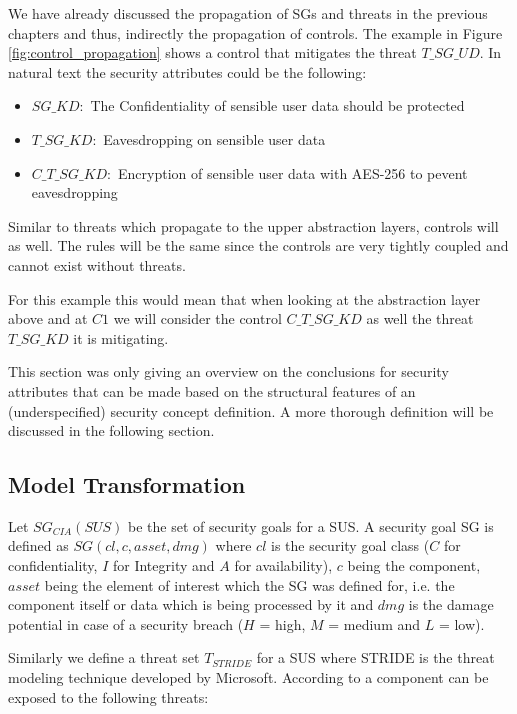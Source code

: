 We have already discussed the propagation of SGs and threats in the previous chapters and thus, indirectly the propagation of controls. The example in Figure \ref{fig:control_propagation} shows a control that mitigates the threat $T\_SG\_UD$. In natural text the security attributes could be the following:

\begin{itemize}
\item[]\textbf{$SG\_KD:$} The Confidentiality of sensible user data should be protected
\item[]\textbf{$T\_SG\_KD:$} Eavesdropping on sensible user data
\item[]\textbf{$C\_T\_SG\_KD:$} Encryption of sensible user data with AES-256 to pevent eavesdropping
\end{itemize}

Similar to threats which propagate to the upper abstraction layers, controls will as well. The rules will be the same since the controls are very tightly coupled and cannot exist without threats.

For this example this would mean that when looking at the abstraction layer above and at $C1$ we will consider the control $C\_T\_SG\_KD$ as well the threat $T\_SG\_KD$ it is mitigating.

This section was only giving an overview on the conclusions for security attributes that can be made based on the structural features of an (underspecified) security concept definition. A more thorough definition will be discussed in the following section. 

\subsection{Model Transformation}

Let $SG_{CIA}(SUS)$ be the set of security goals for a SUS. A security goal SG is defined as $SG(cl, c, asset, dmg)$ where $cl$ is the security goal class ($C$ for confidentiality, $I$ for Integrity and $A$ for availability), $c$ being the component, $asset$ being the element of interest which the SG was defined for, i.e. the component itself or data which is being processed by it and $dmg$ is the damage potential in case of a security breach ($H$ = high, $M$ = medium and $L$ = low).

Similarly we define a threat set $T_{STRIDE}$ for a SUS where STRIDE is the threat modeling technique developed by Microsoft. According to \cite{torr} a component can be exposed to the following threats:

